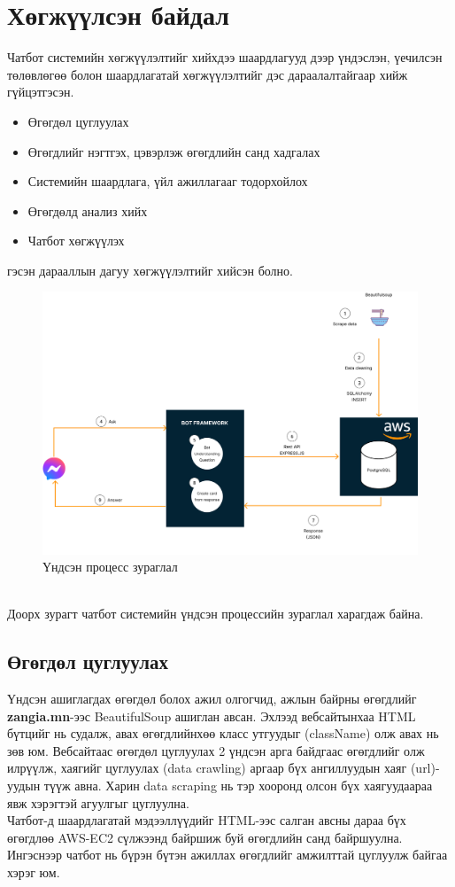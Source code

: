 \section{Хөгжүүлсэн байдал}
Чатбот системийн хөгжүүлэлтийг хийхдээ шаардлагууд дээр үндэслэн, үечилсэн төлөвлөгөө болон шаардлагатай хөгжүүлэлтийг дэс дараалалтайгаар хийж гүйцэтгэсэн.
\begin{itemize}
  \item Өгөгдөл цуглуулах
  \item Өгөгдлийг нэгтгэх, цэвэрлэж өгөгдлийн санд хадгалах
  \item Системийн шаардлага, үйл ажиллагааг тодорхойлох
  \item Өгөгдөлд анализ хийх
  \item Чатбот хөгжүүлэх
\end{itemize}
гэсэн дарааллын дагуу хөгжүүлэлтийг хийсэн болно.
\begin{figure}[ht]
  \centering
  \includegraphics[width = \textwidth-2cm]{images/mainProcess.png}
  \caption{Үндсэн процесс зураглал}\label{mainProcess}
\end{figure}
\\Доорх зурагт чатбот системийн үндсэн процессийн зураглал харагдаж байна. 

\newpage
\subsection{Өгөгдөл цуглуулах}
Үндсэн ашиглагдах өгөгдөл болох ажил олгогчид, ажлын байрны өгөгдлийг \textbf{zangia.mn}-ээс BeautifulSoup ашиглан авсан. Эхлээд вебсайтынхаа HTML бүтцийг нь судалж, авах өгөгдлийнхөө класс утгуудыг (className) олж авах нь зөв юм. Вебсайтаас өгөгдөл цуглуулах 2 үндсэн арга байдгаас өгөгдлийг олж илрүүлж, хаягийг цуглуулах (data crawling) аргаар бүх ангиллуудын хаяг (url)-уудын түүж авна. Харин data scraping нь тэр хооронд олсон бүх хаягуудаараа явж хэрэгтэй агуулгыг цуглуулна.
\\Чатбот-д шаардлагатай мэдээллүүдийг HTML-ээс салган авсны дараа бүх өгөгдлөө AWS-EC2 сүлжээнд байршиж буй өгөгдлийн санд байршуулна. Ингэснээр чатбот нь бүрэн бүтэн ажиллах өгөгдлийг амжилттай цуглуулж байгаа хэрэг юм. 
